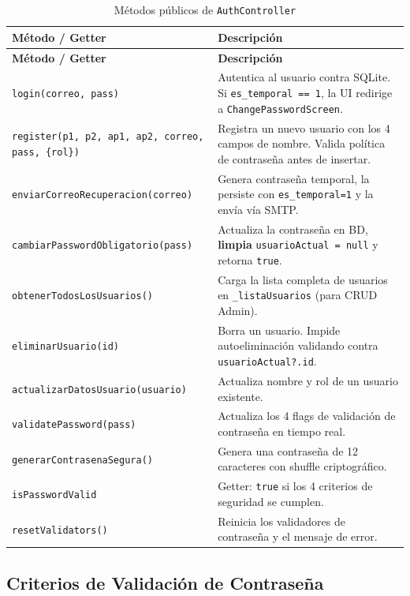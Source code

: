 \documentclass[12pt,a4paper]{article}
\begin{document}
\begin{longtable}{>{\ttfamily}p{5.5cm} p{8cm}}
\caption{Métodos públicos de \texttt{AuthController}} \label{tab:auth-controller} \\
\toprule
\textbf{Método / Getter} & \textbf{Descripción} \\
\midrule
\endfirsthead
\toprule
\textbf{Método / Getter} & \textbf{Descripción} \\
\midrule
\endhead
\bottomrule
\endlastfoot
\texttt{login(correo, pass)} &
  Autentica al usuario contra SQLite. Si \texttt{es\_temporal == 1}, la UI redirige a \texttt{ChangePasswordScreen}. \\[0.3em]
\texttt{register(p1, p2, ap1, ap2, correo, pass, \{rol\})} &
  Registra un nuevo usuario con los 4 campos de nombre. Valida política de contraseña antes de insertar. \\[0.3em]
\texttt{enviarCorreoRecuperacion(correo)} &
  Genera contraseña temporal, la persiste con \texttt{es\_temporal=1} y la envía vía SMTP. \\[0.3em]
\texttt{cambiarPasswordObligatorio(pass)} &
  Actualiza la contraseña en BD, \textbf{limpia} \texttt{usuarioActual = null} y retorna \texttt{true}. \\[0.3em]
\texttt{obtenerTodosLosUsuarios()} &
  Carga la lista completa de usuarios en \texttt{\_listaUsuarios} (para CRUD Admin). \\[0.3em]
\texttt{eliminarUsuario(id)} &
  Borra un usuario. Impide autoeliminación validando contra \texttt{usuarioActual?.id}. \\[0.3em]
\texttt{actualizarDatosUsuario(usuario)} &
  Actualiza nombre y rol de un usuario existente. \\[0.3em]
\texttt{validatePassword(pass)} &
  Actualiza los 4 flags de validación de contraseña en tiempo real. \\[0.3em]
\texttt{generarContrasenaSegura()} &
  Genera una contraseña de 12 caracteres con shuffle criptográfico. \\[0.3em]
\texttt{isPasswordValid} &
  Getter: \texttt{true} si los 4 criterios de seguridad se cumplen. \\[0.3em]
\texttt{resetValidators()} &
  Reinicia los validadores de contraseña y el mensaje de error. \\
\end{longtable}

\subsection{Criterios de Validación de Contraseña}
\end{document}
